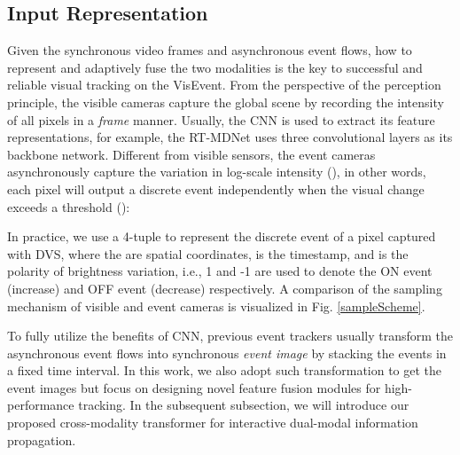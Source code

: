 \documentclass[journal]{IEEEtran}
\begin{document}
\subsection{Input Representation}  \label{InputRepresent} 

Given the synchronous video frames and asynchronous event flows, how to represent and adaptively fuse the two modalities is the key to successful and reliable visual tracking on the VisEvent. From the perspective of the perception principle, the visible cameras capture the global scene by recording the intensity of all pixels in a \emph{frame} manner. Usually, the CNN is used to extract its feature representations, for example, the RT-MDNet \cite{Jung_2018_ECCV} uses three convolutional layers as its backbone network. Different from visible sensors, the event cameras asynchronously capture the variation in log-scale intensity (), in other words, each pixel will output a discrete event independently when the visual change exceeds a threshold (): 

In practice, we use a 4-tuple  to represent the discrete event of a pixel captured with DVS, where the  are spatial coordinates,  is the timestamp, and  is the polarity of brightness variation, i.e., 1 and -1 are used to denote the ON event (increase) and OFF event (decrease) respectively. A comparison of the sampling mechanism of visible and event cameras is visualized in Fig. \ref{sampleScheme}. 


To fully utilize the benefits of CNN, previous event trackers \cite{ramesh2018eventlong, chen2019asynchronouseventtrack, chen2020eventTrack} usually transform the asynchronous event flows into synchronous \emph{event image} by stacking the events in a fixed time interval. In this work, we also adopt such transformation to get the event images but focus on designing novel feature fusion modules for high-performance tracking. In the subsequent subsection, we will introduce our proposed cross-modality transformer for interactive dual-modal information propagation.  
\end{document}
